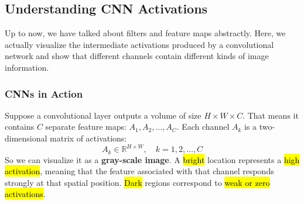 \subsection{Understanding CNN Activations}\label{sec:understanding-cnn-activations}

Up to now, we have talked about filters and feature maps abstractly. Here, we actually visualize the intermediate activations produced by a convolutional network and show that different channels contain different kinds of image information.

\longline

\subsubsection{CNNs in Action}\label{sec:cnns-in-action}

Suppose a convolutional layer outputs a volume of size $H \times W \times C$. That means it contains $C$ separate feature maps: $A_1, A_2, \ldots, A_C$. Each channel $A_k$ is a two-dimensional matrix of activations:
\begin{equation*}
    A_k \in \mathbb{R}^{H \times W}, \quad k = 1, 2, \ldots, C
\end{equation*}
So we can visualize it as a \textbf{gray-scale image}. A \hl{bright} location represents a \hl{high activation}, meaning that the feature associated with that channel responds strongly at that spatial position. \hl{Dark} regions correspond to \hl{weak or zero activations}.

